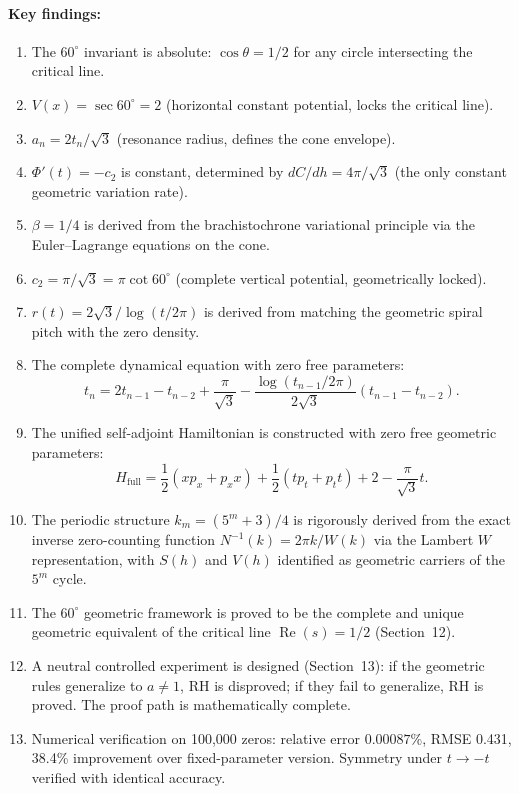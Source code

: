 \documentclass[12pt,a4paper]{article}
\begin{document}
\paragraph{Key findings:}
\begin{enumerate}
\item The $60^\circ$ invariant is absolute: $\cos\theta = 1/2$ for any circle intersecting the critical line.
\item $V(x) = \sec 60^\circ = 2$ (horizontal constant potential, locks the critical line).
\item $a_n = 2t_n/\sqrt{3}$ (resonance radius, defines the cone envelope).
\item $\Phi'(t) = -c_2$ is constant, determined by $dC/dh = 4\pi/\sqrt{3}$ (the only constant geometric variation rate).
\item $\beta = 1/4$ is derived from the brachistochrone variational principle via the Euler--Lagrange equations on the cone.
\item $c_2 = \pi/\sqrt{3} = \pi\cot 60^\circ$ (complete vertical potential, geometrically locked).
\item $r(t) = 2\sqrt{3}/\log(t/2\pi)$ is derived from matching the geometric spiral pitch with the zero density.
\item The complete dynamical equation with zero free parameters:
\begin{equation}
t_n = 2t_{n-1} - t_{n-2} + \frac{\pi}{\sqrt{3}} - \frac{\log(t_{n-1}/2\pi)}{2\sqrt{3}}(t_{n-1} - t_{n-2}).
\end{equation}
\item The unified self-adjoint Hamiltonian is constructed with zero free geometric parameters:
\begin{equation}
H_{\text{full}} = \frac{1}{2}(x p_x + p_x x) + \frac{1}{2}(t p_t + p_t t) + 2 - \frac{\pi}{\sqrt{3}}t.
\end{equation}
\item The periodic structure $k_m = (5^m+3)/4$ is rigorously derived from the exact inverse zero-counting function $N^{-1}(k) = 2\pi k/W(k)$ via the Lambert $W$ representation, with $S(h)$ and $V(h)$ identified as geometric carriers of the $5^m$ cycle.
\item The $60^\circ$ geometric framework is proved to be the complete and unique geometric equivalent of the critical line $\operatorname{Re}(s)=1/2$ (Section~12).
\item A neutral controlled experiment is designed (Section~13): if the geometric rules generalize to $a \neq 1$, RH is disproved; if they fail to generalize, RH is proved. The proof path is mathematically complete.
\item Numerical verification on 100,000 zeros: relative error $0.00087\%$, RMSE 0.431, 38.4\% improvement over fixed-parameter version. Symmetry under $t \to -t$ verified with identical accuracy.
\end{enumerate}
\end{document}
